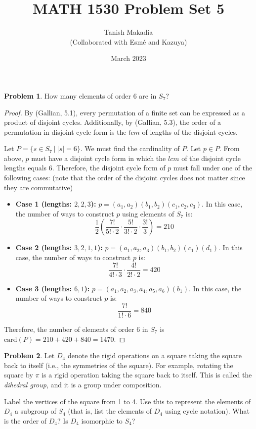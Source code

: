\documentclass[12pt,reqno]{article}
\title{MATH 1530 Problem Set 5}
\author{Tanish Makadia\\\small{(Collaborated with Esmé and Kazuya)}}
\date{March 2023}
\theoremstyle{plain}
\theoremstyle{definition}
\newtheorem{problem}{Problem}
\begin{document}
\maketitle


\begin{problem} 
    How many elements of order 6 are in $S_7$?
\end{problem}

\begin{proof}
    By (Gallian, 5.1), every permutation of a finite set can be expressed as a product of
    disjoint cycles. Additionally, by (Gallian, 5.3), the order of a permutation in disjoint
    cycle form is the \(lcm\) of lengths of the disjoint cycles. 
    
    Let \(P = \{s\in S_7\ |\ |s|=6\}\). We must find the cardinality of \(P\). Let \(p\in P\). From above, \(p\) must have a disjoint cycle form in which the \(lcm\) of
    the disjoint cycle lengths equals \(6\). Therefore, the disjoint cycle form of \(p\) must fall under one
    of the following cases: (note that the order of the disjoint cycles does not matter since they are commutative)
    \begin{itemize}
        \item \textbf{Case 1 (lengths: \(2, 2, 3\)):} \(p = (a_1, a_2)(b_1, b_2)(c_1, c_2, c_3)\). In this case, the number of ways to construct \(p\) using
        elements of \(S_7\) is:
        \[\frac{1}{2}\left(\frac{7!}{5!\cdot 2}\cdot\frac{5!}{3!\cdot 2}\cdot\frac{3!}{3}\right)=210\]
        \item \textbf{Case 2 (lengths: \(3,2,1,1\)):} \(p = (a_1,a_2,a_3)(b_1,b_2)(c_1)(d_1)\). In this case, the number of ways to construct
        \(p\) is:
        \[\frac{7!}{4!\cdot 3}\cdot\frac{4!}{2!\cdot 2}=420\]
        \item \textbf{Case 3 (lengths: \(6,1\)):} \(p=(a_1,a_2,a_3,a_4,a_5,a_6)(b_1)\). In this case, the number of ways to construct
        \(p\) is:
        \[\frac{7!}{1!\cdot 6}=840\]
    \end{itemize}
    Therefore, the number of elements of order \(6\) in \(S_7\) is \(\mathrm{card}(P)=210+420+840=1470\).
\end{proof}

\newpage


\begin{problem} 
    Let $D_4$ denote the rigid operations on a square taking the square back to itself (i.e., the symmetries of the square). For example, rotating the square by $\pi$ is a rigid operation taking the square back to itself. This is called the \emph{dihedral group}, and it is a group under composition.
    
    Label the vertices of the square from 1 to 4. Use this to represent the elements of $D_4$ a subgroup of $S_4$ (that is, list the elements of $D_4$ using cycle notation). What is the order of $D_4?$ Is $D_4$ isomorphic to $S_4$?
\end{problem}
\end{document}
